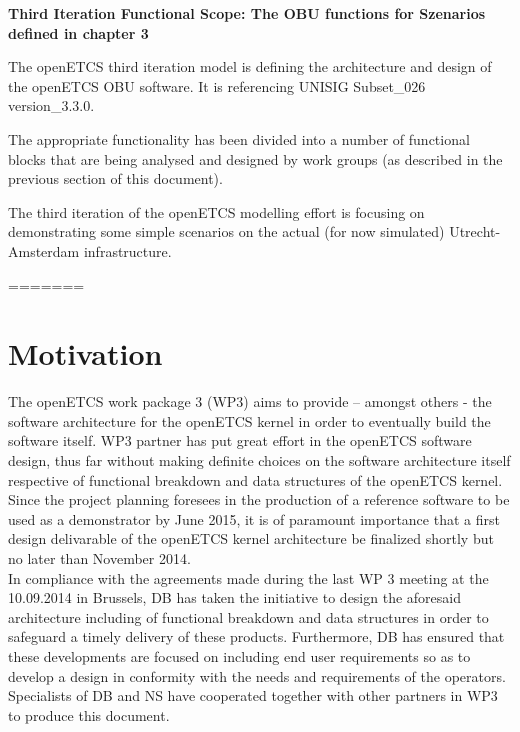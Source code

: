 \textbf{Third Iteration Functional Scope: The OBU functions for Szenarios defined in chapter 3}

The openETCS third iteration model is defining the architecture and design of the openETCS OBU software. 
It is referencing  \cite{subset-026} UNISIG Subset\_026 version\_3.3.0. 

The appropriate functionality has been divided into a number of functional blocks that are being analysed and designed by work groups (as described in the previous section of this document).

The third iteration of the openETCS modelling effort is focusing on demonstrating some simple scenarios on the actual (for now simulated) Utrecht- Amsterdam infrastructure.

=======
%

\section{Motivation}
The openETCS work package 3 (WP3) aims to provide – amongst others - the software architecture for the openETCS kernel in order to eventually build the software itself. WP3  partner has put great effort in the openETCS software design, thus far without making definite choices on the software architecture itself respective of functional breakdown and data structures of the openETCS kernel. Since the project planning foresees in the production of a reference software to be used as a demonstrator by June 2015, it is of paramount importance that a first design delivarable of the openETCS kernel architecture be finalized shortly but no later than November 2014.\\

In compliance with the agreements made during the last WP 3 meeting at the 10.09.2014 in Brussels, DB has taken the initiative to design the aforesaid architecture including of functional breakdown and data structures in order to safeguard a timely delivery of these products. Furthermore, DB has ensured that these developments are focused on including end user requirements so as to develop a design in conformity with the needs and requirements of the operators. Specialists of DB and NS have cooperated together with other partners in WP3 to produce this document.\\

